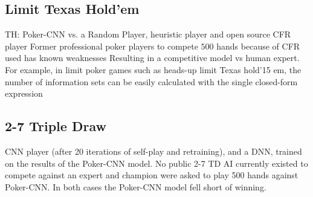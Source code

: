 \documentclass[review]{elsarticle}
\begin{document}
\subsection{Limit Texas Hold'em}
TH: Poker-CNN vs. a Random Player, heuristic player and open source 
CFR player Former professional poker players to compete $500$ hands 
because of CFR used has known weaknesses Resulting in a competitive 
model vs human expert.\\





For example, in limit poker games such as heads-up limit Texas hold{\ttfamily\char'15} 
em, the number of information sets can be easily calculated with the single closed-form 
expression\\



\subsection{2-7 Triple Draw}
CNN player (after 20 iterations of self-play and retraining), and a DNN, trained on the 
results of the Poker-CNN model. No public 2-7 TD AI currently existed to compete against 
an expert and champion were asked to play 500 hands against Poker-CNN. In both cases the 
Poker-CNN model fell short of winning.
\end{document}
